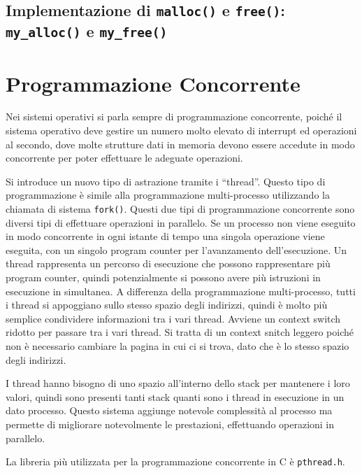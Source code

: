 \documentclass{article}
\numberwithin{equation}{subsection}
\begin{document}
\subsection{Implementazione di \texttt{malloc()} e \texttt{free()}: \texttt{my\_alloc()} e \texttt{my\_free()}}


\clearpage

\section{Programmazione Concorrente}

Nei sistemi operativi si parla sempre di programmazione concorrente, poiché il sistema operativo deve gestire un numero molto elevato di interrupt ed operazioni al secondo, 
dove molte strutture dati in memoria devono essere accedute in modo concorrente per poter effettuare le adeguate operazioni. 

Si introduce un nuovo tipo di astrazione tramite i ``thread''. Questo tipo di programmazione è simile alla programmazione multi-processo utilizzando la chiamata di 
sistema \verb|fork()|. Questi due tipi di programmazione concorrente sono diversi tipi di effettuare operazioni in parallelo. Se un processo non viene eseguito in 
modo concorrente in ogni istante di tempo una singola operazione viene eseguita, con un singolo program counter per l'avanzamento dell'esecuzione. Un thread rappresenta 
un percorso di esecuzione che possono rappresentare più program counter, quindi potenzialmente si possono avere più istruzioni in esecuzione in simultanea. 
A differenza della programmazione multi-processo, tutti i thread si appoggiano sullo stesso spazio degli indirizzi, quindi è molto più semplice condividere informazioni 
tra i vari thread. Avviene un context switch ridotto per passare tra i vari thread. Si tratta di un context snitch leggero poiché non è necessario cambiare la pagina 
in cui ci si trova, dato che è lo stesso spazio degli indirizzi. 

I thread hanno bisogno di uno spazio all'interno dello stack per mantenere i loro valori, quindi sono presenti tanti stack quanti sono i thread in esecuzione in un dato 
processo. 
Questo sistema aggiunge notevole complessità al processo ma permette di migliorare notevolmente le prestazioni, effettuando operazioni in parallelo. 


La libreria più utilizzata per la programmazione concorrente in C è \verb|pthread.h|. 
\end{document}
